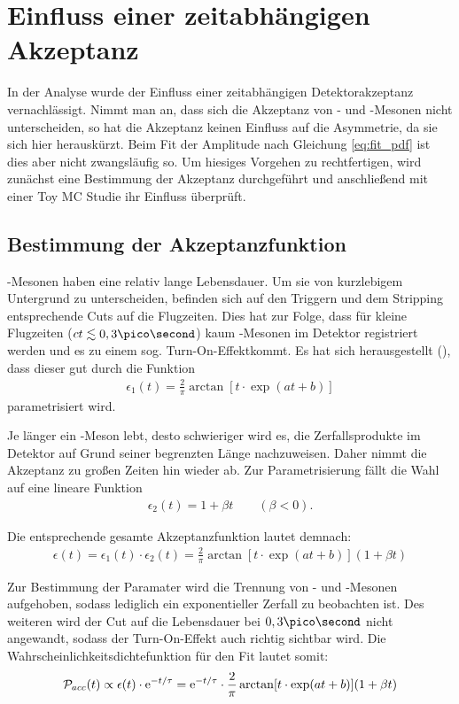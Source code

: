 \section{Einfluss einer zeitabhängigen Akzeptanz} \label{kap:akzeptanz}
In der Analyse wurde der Einfluss einer zeitabhängigen Detektorakzeptanz vernachlässigt. Nimmt man an, dass sich die Akzeptanz von \Bd- und \Bdbar-Mesonen nicht unterscheiden, so hat die Akzeptanz keinen Einfluss auf die Asymmetrie, da sie sich hier herauskürzt. Beim Fit der Amplitude nach Gleichung \ref{eq:fit_pdf} ist dies aber nicht zwangsläufig so. Um hiesiges Vorgehen zu rechtfertigen, wird zunächst eine Bestimmung der Akzeptanz durchgeführt und anschließend mit einer Toy MC Studie ihr Einfluss überprüft.

\subsection{Bestimmung der Akzeptanzfunktion} \label{kap:akzeptanz_bestimmung}
\Bd-Mesonen haben eine relativ lange Lebensdauer. Um sie von kurzlebigem Untergrund zu unterscheiden, befinden sich auf den Triggern und dem Stripping entsprechende Cuts auf die Flugzeiten. Dies hat zur Folge, dass für kleine Flugzeiten ($ct \lesssim 0,3\pico\second$) kaum \Bd-Mesonen im Detektor registriert werden und es zu einem sog. \glqq Turn-On-Effekt\grqq kommt. Es hat sich herausgestellt (\cite{lhcb-paper}), dass dieser gut durch die Funktion
\begin{align}
\epsilon_1(t) = \frac{2}{\pi}\arctan[t\cdot \exp(at+b)]
\end{align}
parametrisiert wird.

Je länger ein \Bd-Meson lebt, desto schwieriger wird es, die Zerfallsprodukte im Detektor auf Grund seiner begrenzten Länge nachzuweisen. Daher nimmt die Akzeptanz zu großen Zeiten hin wieder ab. Zur Parametrisierung fällt die Wahl auf eine lineare Funktion
\begin{align}
\epsilon_2(t) = 1 + \beta t \qquad (\beta < 0).
\end{align}

Die entsprechende gesamte Akzeptanzfunktion lautet demnach:
\begin{align}
\epsilon(t) = \epsilon_1(t) \cdot \epsilon_2(t) = \frac{2}{\pi}\arctan[t\cdot \exp(at+b)](1 + \beta t)
\end{align}

Zur Bestimmung der Paramater wird die Trennung von \Bd- und \Bdbar-Mesonen aufgehoben, sodass lediglich ein exponentieller Zerfall zu beobachten ist. Des weiteren wird der Cut auf die Lebensdauer bei $0,3\pico\second$ nicht angewandt, sodass der Turn-On-Effekt auch richtig sichtbar wird. Die Wahrscheinlichkeitsdichtefunktion für den Fit lautet somit:
\begin{align}
\mathcal{P}_{acc}(t) \propto \epsilon(t)\cdot \mathrm{e}^{-t/\tau} = \mathrm{e}^{-t/\tau}\cdot\frac{2}{\pi}\arctan[t\cdot \exp(at+b)](1 + \beta t)
\end{align}


